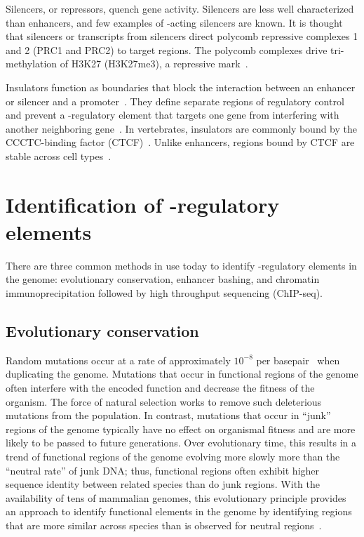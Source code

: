 Silencers, or repressors, quench gene activity.  Silencers are less well characterized than enhancers, and few
examples of \cis-acting silencers are known.  It is thought that silencers or transcripts from silencers direct polycomb repressive
complexes 1 and 2 (PRC1 and PRC2) to target regions.  The polycomb complexes drive tri-methylation of H3K27 (H3K27me3), a
repressive mark~\citep{Kolovos2012}.
%

Insulators function as boundaries that block the interaction between an enhancer or silencer and a promoter~\citep{Bushey2008}.
They define separate regions of regulatory control and prevent a \cis-regulatory element that targets one gene from
interfering with another neighboring gene~\citep{Kolovos2012}.  In vertebrates, insulators are commonly bound by the
CCCTC-binding factor (CTCF)~\citep{Kolovos2012}.  Unlike enhancers, regions bound by CTCF are stable across cell types~\citep{Ernst2011}.
%

\section{Identification of \cis-regulatory elements}
%
There are three common methods in use today to identify \cis-regulatory elements in the genome: evolutionary conservation,
enhancer bashing, and chromatin immunoprecipitation followed by high throughput sequencing (ChIP-seq).
%

\subsection{Evolutionary conservation}
Random mutations occur at a rate of approximately \begin{math}10^{-8}\end{math} per basepair~\citep{Xue2009,Roach2010}
when duplicating the genome.  Mutations that occur in functional regions of the genome often interfere with the encoded
function and decrease the fitness of the organism.  The force of natural selection works to remove such deleterious
mutations from the population.  In contrast, mutations that occur in ``junk'' regions of the genome typically have no effect
on organismal fitness and are more likely to be passed to future generations.  Over evolutionary time, this results in a trend
of functional regions of the genome evolving more slowly more than the ``neutral rate'' of junk DNA; thus, functional
regions often exhibit higher sequence identity between related species than do junk regions.  With the availability of
tens of mammalian genomes, this evolutionary principle provides an approach to identify functional elements in the genome
by identifying regions that are more similar across species than is observed for neutral
regions~\citep{Bejerano2004,Siepel2005,Waterston2002}.
%

